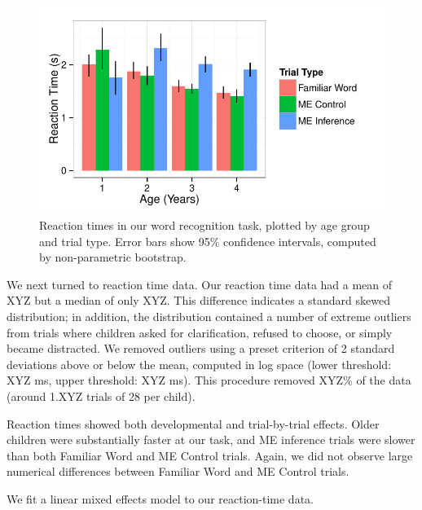 \documentclass[man,noapacite]{apa2}
\begin{document}
\begin{figure}[t] 
  \begin{center} 
    \includegraphics[width=5in]{figures/rt.pdf} 
    \caption{\label{fig:rt} Reaction times in our word recognition task, plotted by age group and trial type. Error bars show 95\% confidence intervals, computed by non-parametric bootstrap.}
  \end{center} 
\end{figure}

We next turned to reaction time data. Our reaction time data had a mean of XYZ but a median of only XYZ. This difference indicates a standard skewed distribution; in addition, the distribution contained a number of extreme outliers from trials where children asked for clarification, refused to choose, or simply became distracted. We removed outliers using a preset criterion of 2 standard deviations above or below the mean, computed in log space (lower threshold: XYZ ms, upper threshold: XYZ ms). This procedure removed XYZ\% of the data (around 1.XYZ trials of 28 per child). 

Reaction times showed both developmental and trial-by-trial effects. Older children were substantially faster at our task, and ME inference trials were slower than both Familiar Word and ME Control trials. Again, we did not observe large numerical differences between Familiar Word and ME Control trials.

We fit a linear mixed effects model to our reaction-time data. 
\end{document}

